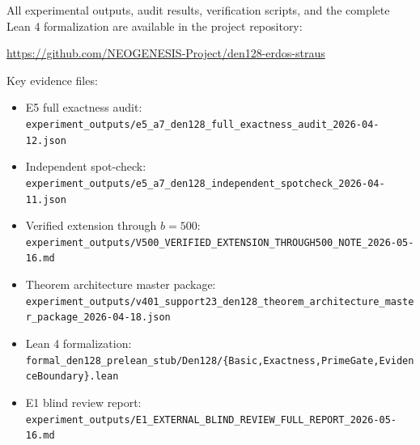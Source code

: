 \documentclass[11pt,letterpaper]{article}
\begin{document}
All experimental outputs, audit results, verification scripts, and the complete Lean 4 formalization are available in the project repository:

\begin{center}
\url{https://github.com/NEOGENESIS-Project/den128-erdos-straus}
\end{center}

Key evidence files:
\begin{itemize}
    \item E5 full exactness audit: \texttt{experiment\_outputs/e5\_a7\_den128\_full\_exactness\_audit\_2026-04-12.json}
    \item Independent spot-check: \texttt{experiment\_outputs/e5\_a7\_den128\_independent\_spotcheck\_2026-04-11.json}
    \item Verified extension through $b=500$: \texttt{experiment\_outputs/V500\_VERIFIED\_EXTENSION\_THROUGH500\_NOTE\_2026-05-16.md}
    \item Theorem architecture master package: \texttt{experiment\_outputs/v401\_support23\_den128\_theorem\_architecture\_master\_package\_2026-04-18.json}
    \item Lean 4 formalization: \texttt{formal\_den128\_prelean\_stub/Den128/\{Basic,Exactness,PrimeGate,EvidenceBoundary\}.lean}
    \item E1 blind review report: \texttt{experiment\_outputs/E1\_EXTERNAL\_BLIND\_REVIEW\_FULL\_REPORT\_2026-05-16.md}
\end{itemize}



\end{document}
